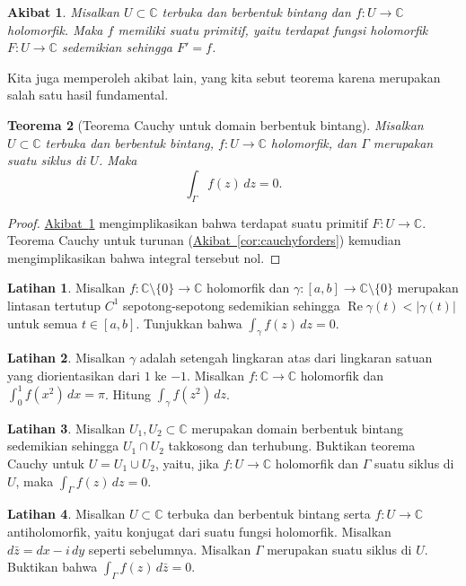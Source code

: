 \documentclass[12pt,openany]{book}
\renewcommand{\Re}{\operatorname{Re}}
\newcommand{\sabs}[1]{\lvert {#1} \rvert}
\newcommand{\C}{{\mathbb{C}}}
\theoremstyle{plain}
\newtheorem{thm}{Teorema}[section]
\newtheorem{cor}[thm]{Akibat}
\theoremstyle{remark}
\theoremstyle{definition}
\newenvironment{exbox}{%
    \def\FrameCommand{\vrule width 1pt \relax\hspace{10pt}}%
    \MakeFramed{\advance\hsize-\width\FrameRestore}%
}{%
    \endMakeFramed
}
\theoremstyle{exercise}
\newtheorem{exercise}{Latihan}[section]
\theoremstyle{example}
\newcommand{\corref}[1]{\hyperref[#1]{Akibat~\ref*{#1}}}
\begin{document}
\begin{cor} \label{cor:primitiveinstarlike}
Misalkan $U \subset \C$ terbuka dan berbentuk bintang
dan $f \colon U \to \C$ holomorfik.
Maka $f$ memiliki suatu primitif, yaitu
terdapat fungsi holomorfik $F \colon U \to \C$
sedemikian sehingga $F' = f$.
\end{cor}

Kita juga memperoleh akibat lain, yang kita sebut
teorema karena merupakan salah satu hasil fundamental.

\begin{thm}[Teorema Cauchy untuk domain berbentuk bintang]
%
Misalkan $U \subset \C$ terbuka dan berbentuk bintang, $f \colon U \to \C$ holomorfik,
dan $\Gamma$ merupakan
suatu siklus
di $U$.  Maka
\begin{equation*}
\int_{\Gamma} f(z) \, dz = 0 .
\end{equation*}
\end{thm}

\begin{proof}
\corref{cor:primitiveinstarlike} mengimplikasikan bahwa terdapat
suatu primitif $F \colon U \to \C$.
Teorema Cauchy untuk turunan (\corref{cor:cauchyforders}) kemudian mengimplikasikan bahwa integral tersebut nol.
\end{proof}

\begin{exbox}
\begin{exercise}
Misalkan $f \colon \C \setminus \{ 0 \} \to \C$ holomorfik
dan
$\gamma \colon [a,b] \to \C \setminus \{ 0 \}$ merupakan lintasan tertutup $C^1$ sepotong-sepotong
sedemikian sehingga $\Re \gamma(t) < \sabs{\gamma(t)}$ untuk semua $t \in [a,b]$.
Tunjukkan bahwa $\int_\gamma f(z) \, dz = 0$.
\end{exercise}

\begin{exercise}
Misalkan $\gamma$ adalah setengah lingkaran atas dari lingkaran satuan yang diorientasikan dari $1$ ke
$-1$.   Misalkan $f \colon \C \to \C$ holomorfik
dan $\int_0^1 f(x^2) \, dx = \pi$.
Hitung $\int_\gamma f(z^2) \, dz$.
\end{exercise}

\begin{exercise}
Misalkan $U_1, U_2 \subset \C$ merupakan domain berbentuk bintang sedemikian sehingga $U_1 \cap U_2$
takkosong dan terhubung.  Buktikan teorema Cauchy untuk $U = U_1 \cup U_2$, yaitu,
jika $f \colon U \to \C$ holomorfik dan $\Gamma$ suatu siklus di $U$,
maka $\int_\Gamma f(z) \, dz = 0$.
\end{exercise}

\begin{exercise}
Misalkan $U \subset \C$ terbuka dan berbentuk bintang serta
$f \colon U \to \C$ antiholomorfik, yaitu konjugat dari suatu
fungsi holomorfik.  Misalkan $d\bar{z} = dx - i \, dy$ seperti sebelumnya.  Misalkan
$\Gamma$ merupakan suatu siklus di $U$.  Buktikan bahwa
$\int_\Gamma f(z) \, d\bar{z} = 0$.
\end{exercise}
\end{exbox}
\end{document}
